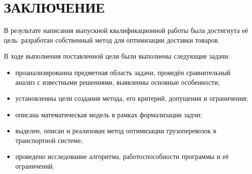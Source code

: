 \section*{ЗАКЛЮЧЕНИЕ}
	В результате написания выпускной квалификационной работы была достигнута её цель: разработан собственный метод для оптимизации доставки товаров.
	
	В ходе выполнения поставленной цели были выполнены следующие задачи:
	\begin{itemize}
		\item проанализированна предметная область задачи, проведён сравнительный анализ с известными решениями, выявленны основные особенности;
		\item установленны цели создания метода, его критерий, допущения и ограничения;
		\item описана математическая модель в рамках формализации задчи;
		\item выделен, описан и реализован метод оптимизации грузоперевозок в транспортной системе;
		\item проведено исследование алгоритма, работоспособности программы и её ограничений.
	\end{itemize}

\pagebreak